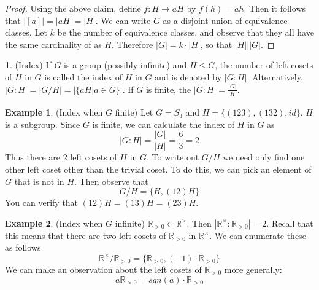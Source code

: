 \documentclass[12pt]{article}
\theoremstyle{definition}
\newtheorem{definition}{\color{NavyBlue}{\textbf{Definition}}}
\newtheorem{example}{\color{WildStrawberry}Example}
\theoremstyle{definition}
\begin{document}
\begin{proof}
Using the above claim, define $f : H \to aH$ by $f(h) = ah$. Then it follows that $|[a] | = |aH| = |H|$. We can write $G$ as a disjoint union of equivalence classes. Let $k$ be the number of equivalence classes, and observe that they all have the same cardinality of as $H$. Therefore $|G| = k \cdot |H|$, so that $|H| \big\vert |G|$.
\end{proof}

\begin{definition}(Index)
If $G$ is a group (possibly infinite) and $H \leq G$, the number of left cosets of $H$ in $G$ is called the index of $H$ in $G$ and is denoted by $|G : H|$. Alternatively, $|G : H| = | G / H | =  |\{aH | a \in G\} |$. If $G$ is finite, the $|G:H| = \frac{|G|}{|H|}$.
\end{definition}

\begin{example}(Index when $G$ finite)
Let $G = S_3$ and $H = \{ (1 2 3), (1 3 2), id \}$. $H$ is a subgroup. Since $G$ is finite, we can calculate the index of $H$ in $G$ as
\begin{equation}
	|G : H| = \frac{|G|}{|H|} = \frac{6}{3} = 2
\end{equation}
Thus there are $2$ left cosets of $H$ in $G$. To write out $G/H$ we need only find one other left coset other than the trivial coset. To do this, we can pick an element of $G$ that is not in $H$. Then observe that 
\begin{equation}
	G/H = \{H, (1 2) H \}
\end{equation}
You can verify that $(1 2) H = (1 3) H = (2 3) H$.
\end{example}

\begin{example}(Index when $G$ infinite)
$\mathbb{R}_{>0} \subset \mathbb{R}^{\times}$. Then $|\mathbb{R}^{\times} : \mathbb{R}_{> 0}| = 2$. Recall that this means that there are two left cosets of $\mathbb{R}_{>0}$ in $\mathbb{R}^{\times}$. We can enumerate these as follows
\begin{equation}
	\mathbb{R}^{\times} / \mathbb{R}_{> 0} = \{\mathbb{R}_{> 0}, (-1) \cdot \mathbb{R}_{> 0}\}
\end{equation}
We can make an observation about the left cosets of $\mathbb{R}_{> 0}$ more generally:
\begin{equation}
	a \mathbb{R}_{> 0} = sgn(a) \cdot \mathbb{R}_{> 0}
\end{equation}
\end{example}
\end{document}
